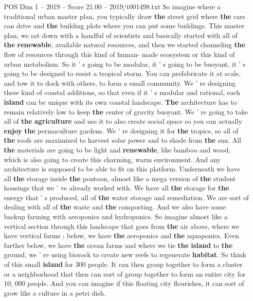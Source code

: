 \begin{textsample}{POS Dim 1 – 2019 – Score 21.00 – 2019/t001498.txt}
So imagine where a traditional urban master plan, you typically draw \textbf{the} street grid where \textbf{the} cars can drive and \textbf{the} building plots where you can put some buildings.
This master plan, we sat down with a handful of scientists and basically started with all of \textbf{the} \textbf{renewable}, available natural resources, and then we started channeling \textbf{the} flow of resources through this kind of human- made ecosystem or this kind of urban metabolism.
So it ' s going to be modular, it ' s going to be buoyant, it ' s going to be designed to resist a tropical storm.
You can prefabricate it at scale, and tow it to dock with others, to form a small community.
We ' re designing these kind of coastal additions, so that even if it ' s modular and rational, each \textbf{island} can be unique with its own coastal landscape. \textbf{The} architecture has to remain relatively low to keep \textbf{the} center of gravity buoyant.
We ' re going to take all of \textbf{the} \textbf{agriculture} and use it to also create social space so you can actually \textbf{enjoy} \textbf{the} permaculture gardens.
We ' re designing it for \textbf{the} tropics, so all of \textbf{the} roofs are maximized to harvest solar power and to shade from \textbf{the} sun.
All \textbf{the} materials are going to be light and \textbf{renewable}, like bamboo and wood, which is also going to create this charming, warm environment.
And any architecture is supposed to be able to fit on this platform.
Underneath we have all \textbf{the} storage inside \textbf{the} pontoon, almost like a mega version of \textbf{the} student housings that we ' ve already worked with.
We have all \textbf{the} storage for \textbf{the} energy that ' s produced, all of \textbf{the} water storage and remediation.
We are sort of dealing with all of \textbf{the} waste and \textbf{the} composting.
And we also have some backup farming with aeroponics and hydroponics.
So imagine almost like a vertical section through this landscape that goes from \textbf{the} air above, where we have vertical farms ; below, we have \textbf{the} aeroponics and \textbf{the} aquaponics.
Even further below, we have \textbf{the} ocean farms and where we tie \textbf{the} \textbf{island} to \textbf{the} ground, we ' re using biorock to create new reefs to regenerate \textbf{habitat}.
So think of this small \textbf{island} for 300 people.
It can then group together to form a cluster or a neighborhood that then can sort of group together to form an entire city for 10, 000 people.
And you can imagine if this floating city flourishes, it can sort of grow like a culture in a petri dish.

\end{textsample}
